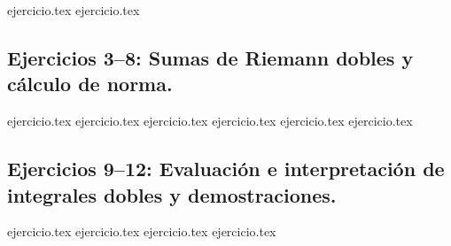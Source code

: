 
\begin{enumerate}
    {ejercicio.tex}
    {ejercicio.tex}
\end{enumerate}

\subsection*{Ejercicios 3--8: Sumas de Riemann dobles y cálculo de norma.}
\begin{enumerate}
    \setcounter{enumi}{2}
    {ejercicio.tex}
    {ejercicio.tex}
    {ejercicio.tex}
    {ejercicio.tex}
    {ejercicio.tex}
    {ejercicio.tex}
\end{enumerate}

\subsection*{Ejercicios 9--12: Evaluación e interpretación de integrales dobles y demostraciones.}
\begin{enumerate}
    \setcounter{enumi}{8}
    {ejercicio.tex}
    {ejercicio.tex}
    {ejercicio.tex}
    {ejercicio.tex}
\end{enumerate}
